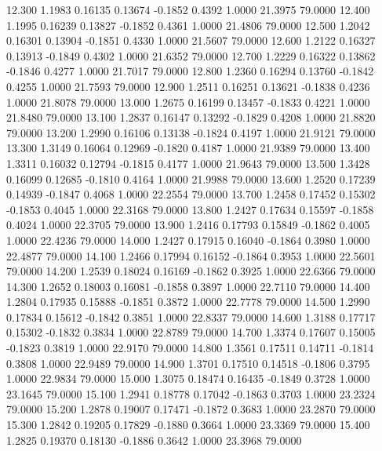   12.300   1.1983   0.16135   0.13674  -0.1852   0.4392   1.0000  21.3975  79.0000
  12.400   1.1995   0.16239   0.13827  -0.1852   0.4361   1.0000  21.4806  79.0000
  12.500   1.2042   0.16301   0.13904  -0.1851   0.4330   1.0000  21.5607  79.0000
  12.600   1.2122   0.16327   0.13913  -0.1849   0.4302   1.0000  21.6352  79.0000
  12.700   1.2229   0.16322   0.13862  -0.1846   0.4277   1.0000  21.7017  79.0000
  12.800   1.2360   0.16294   0.13760  -0.1842   0.4255   1.0000  21.7593  79.0000
  12.900   1.2511   0.16251   0.13621  -0.1838   0.4236   1.0000  21.8078  79.0000
  13.000   1.2675   0.16199   0.13457  -0.1833   0.4221   1.0000  21.8480  79.0000
  13.100   1.2837   0.16147   0.13292  -0.1829   0.4208   1.0000  21.8820  79.0000
  13.200   1.2990   0.16106   0.13138  -0.1824   0.4197   1.0000  21.9121  79.0000
  13.300   1.3149   0.16064   0.12969  -0.1820   0.4187   1.0000  21.9389  79.0000
  13.400   1.3311   0.16032   0.12794  -0.1815   0.4177   1.0000  21.9643  79.0000
  13.500   1.3428   0.16099   0.12685  -0.1810   0.4164   1.0000  21.9988  79.0000
  13.600   1.2520   0.17239   0.14939  -0.1847   0.4068   1.0000  22.2554  79.0000
  13.700   1.2458   0.17452   0.15302  -0.1853   0.4045   1.0000  22.3168  79.0000
  13.800   1.2427   0.17634   0.15597  -0.1858   0.4024   1.0000  22.3705  79.0000
  13.900   1.2416   0.17793   0.15849  -0.1862   0.4005   1.0000  22.4236  79.0000
  14.000   1.2427   0.17915   0.16040  -0.1864   0.3980   1.0000  22.4877  79.0000
  14.100   1.2466   0.17994   0.16152  -0.1864   0.3953   1.0000  22.5601  79.0000
  14.200   1.2539   0.18024   0.16169  -0.1862   0.3925   1.0000  22.6366  79.0000
  14.300   1.2652   0.18003   0.16081  -0.1858   0.3897   1.0000  22.7110  79.0000
  14.400   1.2804   0.17935   0.15888  -0.1851   0.3872   1.0000  22.7778  79.0000
  14.500   1.2990   0.17834   0.15612  -0.1842   0.3851   1.0000  22.8337  79.0000
  14.600   1.3188   0.17717   0.15302  -0.1832   0.3834   1.0000  22.8789  79.0000
  14.700   1.3374   0.17607   0.15005  -0.1823   0.3819   1.0000  22.9170  79.0000
  14.800   1.3561   0.17511   0.14711  -0.1814   0.3808   1.0000  22.9489  79.0000
  14.900   1.3701   0.17510   0.14518  -0.1806   0.3795   1.0000  22.9834  79.0000
  15.000   1.3075   0.18474   0.16435  -0.1849   0.3728   1.0000  23.1645  79.0000
  15.100   1.2941   0.18778   0.17042  -0.1863   0.3703   1.0000  23.2324  79.0000
  15.200   1.2878   0.19007   0.17471  -0.1872   0.3683   1.0000  23.2870  79.0000
  15.300   1.2842   0.19205   0.17829  -0.1880   0.3664   1.0000  23.3369  79.0000
  15.400   1.2825   0.19370   0.18130  -0.1886   0.3642   1.0000  23.3968  79.0000
